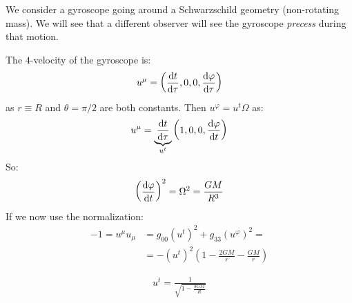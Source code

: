 \documentclass[../template.tex]{subfiles}
\begin{document}
\begin{example}
    We consider a gyroscope going around a Schwarzschild geometry (non-rotating mass). We will see that a different observer will see the gyroscope \textit{precess} during that motion.
    
    The $4$-velocity of the gyroscope is:
    \begin{align*}
        u^\mu = \left(\dv{t}{\tau}, 0, 0, \dv{\varphi}{\tau}\right)
    \end{align*} 
    as $r \equiv R$ and $\theta = \pi/2$ are both constants. Then $u^\varphi = u^t \Omega$ as:
    \begin{align*}
        u^\mu =\underbrace{ \dv{t}{\tau}}_{u^t}  \left(1,0,0,\dv{\varphi}{t}\right)
    \end{align*}   
    So:
    \begin{align*}
        \left(\dv{\varphi}{t}\right)^2 = \Omega^2 = \frac{GM}{R^3} 
    \end{align*}
    If we now use the normalization:
    \begin{align*}
        -1 = u^\mu u_\mu &= g_{00} (u^t)^2 + g_{33} (u^\varphi)^2 = \\
        &= -(u^t)^2 \left(1-\frac{2GM}{r} - \frac{GM}{r}  \right)
    \end{align*}

    \begin{align*}
        u^t = \frac{1}{\sqrt{1-\frac{3GM}{R} }}
    \end{align*}


\end{example}
\end{document}
